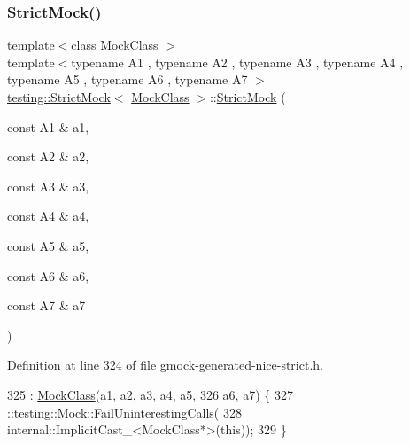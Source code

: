 \subsubsection{\texorpdfstring{Strict\+Mock()}{StrictMock()}\hspace{0.1cm}{\footnotesize\ttfamily [8/11]}}
{\footnotesize\ttfamily template$<$class Mock\+Class $>$ \\
template$<$typename A1 , typename A2 , typename A3 , typename A4 , typename A5 , typename A6 , typename A7 $>$ \\
\hyperlink{classtesting_1_1StrictMock}{testing\+::\+Strict\+Mock}$<$ \hyperlink{classMockClass}{Mock\+Class} $>$\+::\hyperlink{classtesting_1_1StrictMock}{Strict\+Mock} (\begin{DoxyParamCaption}\item[{const A1 \&}]{a1,  }\item[{const A2 \&}]{a2,  }\item[{const A3 \&}]{a3,  }\item[{const A4 \&}]{a4,  }\item[{const A5 \&}]{a5,  }\item[{const A6 \&}]{a6,  }\item[{const A7 \&}]{a7 }\end{DoxyParamCaption})\hspace{0.3cm}{\ttfamily [inline]}}



Definition at line 324 of file gmock-\/generated-\/nice-\/strict.\+h.


\begin{DoxyCode}
325                                                 : \hyperlink{classMockClass}{MockClass}(a1, a2, a3, a4, a5,
326       a6, a7) \{
327     ::testing::Mock::FailUninterestingCalls(
328         internal::ImplicitCast\_<MockClass*>(\textcolor{keyword}{this}));
329   \}
\end{DoxyCode}
\mbox{\label{classtesting_1_1StrictMock_aac6eaaad3e94491ada7bb43ee6149775}} 
